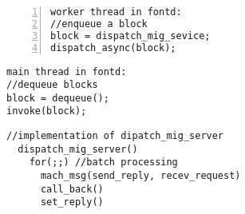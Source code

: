 {\footnotesize\begin{BVerbatim}[baseline=c,numbers=left]
worker thread in fontd:
//enqueue a block
block = dispatch_mig_sevice;
dispatch_async(block);
\end{BVerbatim}
}
\quad
{\footnotesize\begin{BVerbatim}[baseline=c]
main thread in fontd:
//dequeue blocks
block = dequeue();
invoke(block);
\end{BVerbatim}
}

{\verbatimfont{\itshape\ttfamily}\footnotesize\begin{BVerbatim}
//implementation of dipatch_mig_server
  dispatch_mig_server()
    for(;;) //batch processing
      mach_msg(send_reply, recev_request)
      call_back()
      set_reply()
\end{BVerbatim}
}
\bigskip


